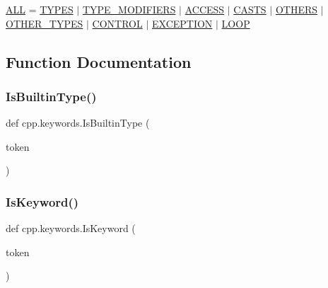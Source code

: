 \begin{DoxyCompactItemize}
\hyperlink{namespacecpp_1_1keywords_a2e8727b78fb9434c99ac8518c6dd1ecc}{A\+LL} = \hyperlink{namespacecpp_1_1keywords_a56fd5baf357970548e1ec366edfc2c13}{T\+Y\+P\+ES} $\vert$ \hyperlink{namespacecpp_1_1keywords_af9282ce418d6b4b43dca5ed574caedd7}{T\+Y\+P\+E\+\_\+\+M\+O\+D\+I\+F\+I\+E\+RS} $\vert$ \hyperlink{namespacecpp_1_1keywords_a786f41bbea982641425c819d10bb2064}{A\+C\+C\+E\+SS} $\vert$ \hyperlink{namespacecpp_1_1keywords_aeba38dc38e188040f4ec44ba05092e7f}{C\+A\+S\+TS} $\vert$ \hyperlink{namespacecpp_1_1keywords_a15fe231fbad145538b73892804898809}{O\+T\+H\+E\+RS} $\vert$ \hyperlink{namespacecpp_1_1keywords_aa86a5e35a3ace14022a5ca1b91baf207}{O\+T\+H\+E\+R\+\_\+\+T\+Y\+P\+ES} $\vert$ \hyperlink{namespacecpp_1_1keywords_a374dfe9c96681079802ba4724287b8ff}{C\+O\+N\+T\+R\+OL} $\vert$ \hyperlink{namespacecpp_1_1keywords_a2665fb8a25a4dae03fa5d3dc975c537c}{E\+X\+C\+E\+P\+T\+I\+ON} $\vert$ \hyperlink{namespacecpp_1_1keywords_af0164c05398a2291487b76414102d555}{L\+O\+OP}
\end{DoxyCompactItemize}


\subsection{Function Documentation}
\mbox{\label{namespacecpp_1_1keywords_ae0f7a581fef26ad1a71c59bd963ee285}} 
\subsubsection{\texorpdfstring{Is\+Builtin\+Type()}{IsBuiltinType()}}
{\footnotesize\ttfamily def cpp.\+keywords.\+Is\+Builtin\+Type (\begin{DoxyParamCaption}\item[{}]{token }\end{DoxyParamCaption})}

\mbox{\label{namespacecpp_1_1keywords_ab9edc2cbd4a9d5ad58a1c0ad3281cbc9}} 
\subsubsection{\texorpdfstring{Is\+Keyword()}{IsKeyword()}}
{\footnotesize\ttfamily def cpp.\+keywords.\+Is\+Keyword (\begin{DoxyParamCaption}\item[{}]{token }\end{DoxyParamCaption})}



